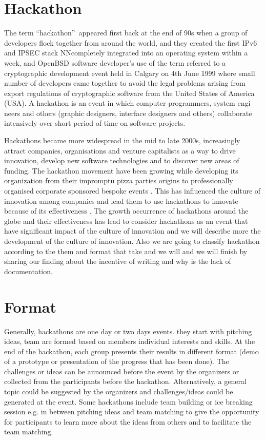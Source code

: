 \section{Hackathon}

The term  \textquotedblleft hackathon\textquotedblright\ appeared first back at the end of 90s when a group of developers flock together from around the world, and they created the first IPv6 and IPSEC stack NNcompletely integrated into an operating system \cite{openbsd} within a week, and OpenBSD software developer’s use of the term referred to a cryptographic development event held in Calgary on 4th June 1999 where small number of developers came together to avoid the legal problems arising from export regulations of cryptographic software from the United States of America (USA). A hackathon is an event in which computer programmers, system engi neers and others (graphic designers, interface designers and others) collaborate intensively over short period of time on software projects.

Hackathons became more widespread in the mid to late 2000s, increasingly attract companies, organisations and venture capitalists as a way to drive innovation, develop new software technologies and to discover new areas of funding. The hackathon movement have been growing while developing its organization from their impromptu pizza parties origins to professionally organised corporate sponsored bespoke events \cite{briscoe2014hackathon}. This has influenced the culture of innovation among companies and lead them to use  hackathons to innovate because of its effectiveness \cite{AnnaCordes2014}. The growth occurrence of hackathons around the globe and their effectiveness has lead to consider hackathons as an event that have significant impact of the culture of innovation and we will describe more the development of the culture of innovation. Also we are going to classify hackathon according to the them and format that take and we will and we will finish by sharing our finding about the incentive of writing and why is the lack of documentation.

\section{Format}
Generally, hackathons are one day or two days events. they start with pitching ideas, team are formed based on members individual interests and skills. At the end of the hackathon, each group presents their results in different format (demo of a prototype or presentation of the progress that has been done). The challenges or ideas can be announced before the event by the organizers or collected from the participants before the hackathon. Alternatively, a general topic could be suggested by the organizers and challenges/ideas could be generated at the event. Some hackathons include team building or ice breaking session e.g. in between pitching ideas and team matching to give the opportunity for participants to learn more about the ideas from others and to facilitate the team matching.


